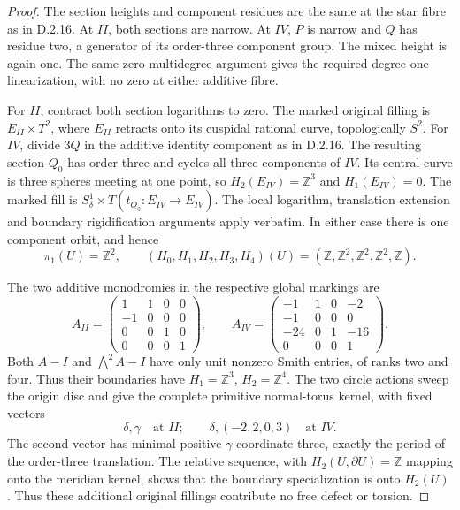 \begin{proof}
The section heights and component residues are the same at
the star fibre as in D.2.16. At $II$, both sections are
narrow. At $IV$, $P$ is narrow and $Q$ has residue two,
a generator of its order-three component group.
The mixed height is again one. The same zero-multidegree
argument gives the required degree-one linearization, with
no zero at either additive fibre.

For $II$, contract both section logarithms to zero. The
marked original filling is $E_{II}\times T^2$, where
$E_{II}$ retracts onto its cuspidal rational curve,
topologically $S^2$. For $IV$, divide $3Q$ in the additive
identity component as in D.2.16. The resulting section
$Q_0$ has order three and cycles all three components of
$IV$. Its central curve is three spheres meeting at one
point, so $H_2(E_{IV})=\mathbb Z^3$ and $H_1(E_{IV})=0$.
The marked fill is
$S^1_\delta\times T(t_{Q_0}:E_{IV}\to E_{IV})$.
The local logarithm, translation extension and boundary
rigidification arguments apply verbatim. In either case
there is one component orbit, and hence
\[
 \pi_1(U)=\mathbb Z^2,\qquad
 (H_0,H_1,H_2,H_3,H_4)(U)
       =(\mathbb Z,\mathbb Z^2,\mathbb Z^2,\mathbb Z^2,\mathbb Z).
\]

The two additive monodromies in the respective global
markings are
\[
 A_{II}=\begin{pmatrix}
 1&1&0&0\\-1&0&0&0\\0&0&1&0\\0&0&0&1
 \end{pmatrix},\qquad
 A_{IV}=\begin{pmatrix}
 -1&1&0&-2\\-1&0&0&0\\-24&0&1&-16\\0&0&0&1
 \end{pmatrix}.
\]
Both $A-I$ and $\bigwedge^2A-I$ have only unit nonzero
Smith entries, of ranks two and four. Thus their boundaries
have $H_1=\mathbb Z^3$, $H_2=\mathbb Z^4$. The two circle
actions sweep the origin disc and give the complete
primitive normal-torus kernel, with fixed vectors
\[
 \delta,\gamma\quad\text{at }II;\qquad
 \delta,(-2,2,0,3)\quad\text{at }IV.
\]
The second vector has minimal positive $\gamma$-coordinate
three, exactly the period of the order-three translation.
The relative sequence, with $H_2(U,\partial U)=\mathbb Z$
mapping onto the meridian kernel, shows that the boundary
specialization is onto $H_2(U)$. Thus these additional
original fillings contribute no free defect or torsion.


\end{proof}

